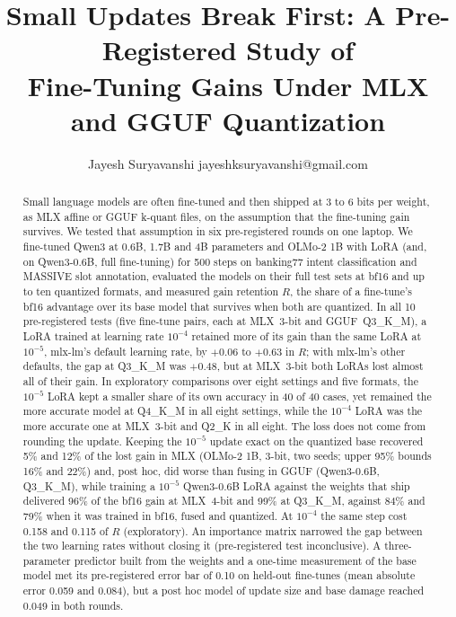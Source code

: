 \documentclass[10pt]{article}
\title{Small Updates Break First: A Pre-Registered Study of\\ Fine-Tuning Gains Under MLX and GGUF Quantization}
\author{\name Jayesh Suryavanshi \email jayeshksuryavanshi@gmail.com}
\begin{document}
\maketitle

\begin{abstract}
\noindent
Small language models are often fine-tuned and then shipped at 3 to 6 bits per weight, as MLX affine or GGUF k-quant files, on the assumption that the fine-tuning gain survives. We tested that assumption in six pre-registered rounds on one laptop. We fine-tuned Qwen3 at 0.6B, 1.7B and 4B parameters and OLMo-2 1B with LoRA (and, on Qwen3-0.6B, full fine-tuning) for 500 steps on banking77 intent classification and MASSIVE slot annotation, evaluated the models on their full test sets at bf16 and up to ten quantized formats, and measured gain retention $R$, the share of a fine-tune's bf16 advantage over its base model that survives when both are quantized. In all 10 pre-registered tests (five fine-tune pairs, each at MLX~3-bit and GGUF~Q3\_K\_M), a LoRA trained at learning rate $10^{-4}$ retained more of its gain than the same LoRA at $10^{-5}$, mlx-lm's default learning rate, by $+0.06$ to $+0.63$ in $R$; with mlx-lm's other defaults, the gap at Q3\_K\_M was $+0.48$, but at MLX~3-bit both LoRAs lost almost all of their gain. In exploratory comparisons over eight settings and five formats, the $10^{-5}$ LoRA kept a smaller share of its own accuracy in 40 of 40 cases, yet remained the more accurate model at Q4\_K\_M in all eight settings, while the $10^{-4}$ LoRA was the more accurate one at MLX~3-bit and Q2\_K in all eight. The loss does not come from rounding the update. Keeping the $10^{-5}$ update exact on the quantized base recovered 5\% and 12\% of the lost gain in MLX (OLMo-2 1B, 3-bit, two seeds; upper 95\% bounds 16\% and 22\%) and, post hoc, did worse than fusing in GGUF (Qwen3-0.6B, Q3\_K\_M), while training a $10^{-5}$ Qwen3-0.6B LoRA against the weights that ship delivered 96\% of the bf16 gain at MLX~4-bit and 99\% at Q3\_K\_M, against 84\% and 79\% when it was trained in bf16, fused and quantized. At $10^{-4}$ the same step cost 0.158 and 0.115 of $R$ (exploratory). An importance matrix narrowed the gap between the two learning rates without closing it (pre-registered test inconclusive). A three-parameter predictor built from the weights and a one-time measurement of the base model met its pre-registered error bar of 0.10 on held-out fine-tunes (mean absolute error 0.059 and 0.084), but a post hoc model of update size and base damage reached 0.049 in both rounds.
\end{abstract}
\end{document}
